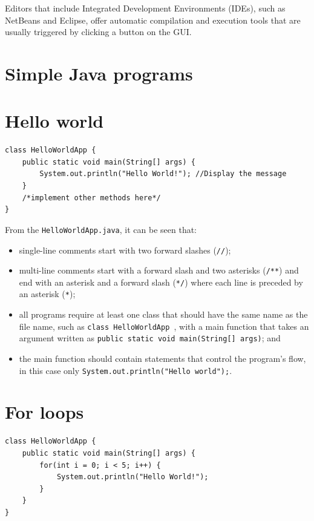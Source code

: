 \documentclass[a4paper]{systems-software}
\begin{document}
Editors that include Integrated Development Environments (IDEs), such as NetBeans and Eclipse, offer automatic compilation and execution tools that are usually triggered by clicking a button on the GUI.


\newpage

\section{Simple Java programs}

\section*{Hello world}

\begin{lstlisting}[title={HelloWorldApp.java}]
class HelloWorldApp {
	public static void main(String[] args) {
		System.out.println("Hello World!"); //Display the message
	}
	/*implement other methods here*/
}
\end{lstlisting}

From the \texttt{HelloWorldApp.java}, it can be seen that:
\begin{itemize}
	\item single-line comments start with two forward slashes (\texttt{//});
	\item multi-line comments start with a forward slash and two asterisks (\texttt{/**}) and end with an asterisk and a forward slash (\texttt{*/}) where each line is preceded by an asterisk (\texttt{*});
	\item all programs require at least one class that should have the same name as the file name, such as \texttt{class HelloWorldApp \string{ \string}}, with a main function that takes an argument written as \texttt{public static void main(String[] args)\string{ \string}}; and
	\item the main function should contain statements that control the program's flow, in this case only \texttt{System.out.println("Hello world");}.
\end{itemize}


\section*{For loops}

\begin{lstlisting}[title={HelloWorldApp2.java}]
class HelloWorldApp {
	public static void main(String[] args) {
		for(int i = 0; i < 5; i++) {
			System.out.println("Hello World!");
		}
	}
}
\end{lstlisting}
\end{document}
